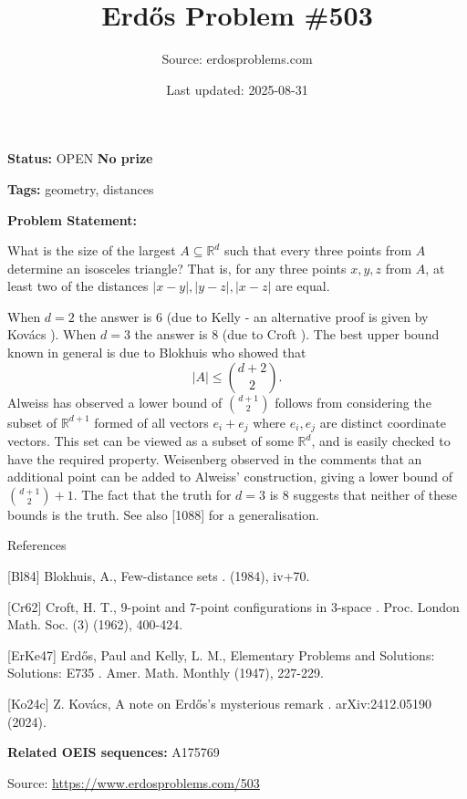 \documentclass{article}
\title{Erd\H{o}s Problem \#503}
\date{Last updated: 2025-08-31}
\author{Source: erdosproblems.com}
\begin{document}
\maketitle

\noindent\textbf{Status:} OPEN \quad \textbf{No prize}

\noindent\textbf{Tags:} geometry, distances

\medskip

\noindent\textbf{Problem Statement:}

What is the size of the largest $A\subseteq \mathbb{R}^d$ such that every three points from $A$ determine an isosceles triangle? That is, for any three points $x,y,z$ from $A$, at least two of the distances $\lvert x-y\rvert,\lvert y-z\rvert,\lvert x-z\rvert$ are equal.




When $d=2$ the answer is $6$ (due to Kelly \cite{ErKe47} - an alternative proof is given by Kov\'{a}cs \cite{Ko24c}). When $d=3$ the answer is $8$ (due to Croft \cite{Cr62}). The best upper bound known in general is due to Blokhuis \cite{Bl84} who showed that\[\lvert A\rvert \leq \binom{d+2}{2}.\]Alweiss has observed a lower bound of $\binom{d+1}{2}$ follows from considering the subset of $\mathbb{R}^{d+1}$ formed of all vectors $e_i+e_j$ where $e_i,e_j$ are distinct coordinate vectors. This set can be viewed as a subset of some $\mathbb{R}^d$, and is easily checked to have the required property. Weisenberg observed in the comments that an additional point can be added to Alweiss' construction, giving a lower bound of $\binom{d+1}{2}+1$. The fact that the truth for $d=3$ is $8$ suggests that neither of these bounds is the truth. See also [1088] for a generalisation.




References

[Bl84] Blokhuis, A., Few-distance sets . (1984), iv+70.

[Cr62] Croft, H. T., $9$-point and $7$-point configurations in $3$-space . Proc. London Math. Soc. (3) (1962), 400-424.

[ErKe47] Erd\H{o}s, Paul and Kelly, L. M., Elementary Problems and Solutions: Solutions: E735 . Amer. Math. Monthly (1947), 227-229.

[Ko24c] Z. Kov\'{a}cs, A note on Erd\H{o}s's mysterious remark . arXiv:2412.05190 (2024).

\noindent\textbf{Related OEIS sequences:} A175769


\bigskip
\noindent\small{Source: \url{https://www.erdosproblems.com/503}}
\end{document}
